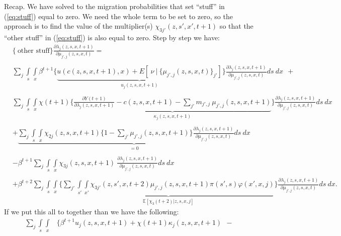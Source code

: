 \documentclass[12pt,pdftex]{article}
\begin{document}
\begin{onehalfspacing}
Recap. We have solved to the migration probabilities that set ``stuff'' in (\ref{eq:stuff}) equal to zero. We need the whole term to be set to zero, so the approach is to find the value of the multiplier(s) $\chi_{3j'}(z, s',x', t+1)$ so that the ``other stuff'' in (\ref{eq:stuff}) is also equal to zero. Step by step we have:
{\small
\begin{align}
& \bigg \{ \ \mbox{other \ stuff} \bigg \} \frac{\partial \lambda_{j}(z, s, x, t+1)}{\partial \mu_{j',j}(z, s, x,t)} =  \\
\nonumber \\
& \sum_{j}  \int\limits_{s} \int\limits_{x} \beta^{t+1} \bigg \{ \underbrace{u(c(z, s, x, t+1), x) + E[\ \nu \ | \ \big\{\mu_{j',j}(z,s,x,t)\big\}_{j'}] }_{u_{j}(z,s,x,t+1)}\bigg \}  \frac{\partial \lambda_{j}(z, s, x, t+1)}{\partial \mu_{j',j}(z, s,x,t)} ds \ dx \ \ + \ \ \\
\nonumber \\
& \sum_{j} \int\limits_{s} \int\limits_{x}  \chi(t+1) \Bigg \{ \underbrace{\frac{\partial Y(t+1)}{\partial \lambda_{j}(z, s, x, t+1)} - c(z,s,x,t+1) - \sum_{j'}  m_{j',j} \ \mu_{j',j}(z, s, x, t+1)}_{\kappa_j(z, s, x, t+1)} \Bigg \} \frac{\partial \lambda_{j}(z,s,x, t+1)}{\partial \mu_{j',j}(z,s,x,t)} ds \ dx\\
\nonumber \\
& + \underbrace{\sum_{j} \int\limits_{s} \int\limits_{x} \chi_{2j}(z, s, x, t+1) \bigg \{1 - \sum_{j'} \mu_{j',j}(z, s,x,t+1) \bigg \} \frac{\partial \lambda_{j}(z,s,x, t+1)}{\partial \mu_{j',j}(z,s,x,t)} ds \ dx }_{ = 0} \\
\nonumber \\
& - \beta^{t+1} \sum_{j} \int\limits_{s} \int\limits_{x} \chi_{3j}(z, s, x, t+1) \ \frac{\partial \lambda_{j}(z, s, x,t+1)}{\partial \mu_{j',j}(z,s,x,t)} ds \ dx  \\
\nonumber \\
& + \beta^{t+2}\sum_{j} \int\limits_{s}  \int\limits_{x} \bigg \{ \underbrace{ \sum_{j'}  \int\limits_{s'} \int\limits_{x'} \chi_{3j'}(z, s',x, t+2) \mu_{j',j}(z, s,x,t+1) \pi(s',s) \varphi(x',x, j) }_{\mathbb{E}\left[\chi_{3}(t+2) |z, s, x, j \right]} \bigg \}  \frac{\partial \lambda_{j}(z, s, x, t+1)}{\partial \mu_{j',j}(z, s,x,t)} ds \ dx.
\end{align}}
If we put this all to together than we have the following:
{\small
\begin{align}
\sum_{j}  \int\limits_{s} \int\limits_{x} &\bigg \{ \beta^{t+1} u_{j}(z,s,x,t+1) + \chi(t+1) \kappa_j(z,s,x,t+1) \ \ - \ \ \\

\end{align}}
\end{onehalfspacing}
\end{document}
